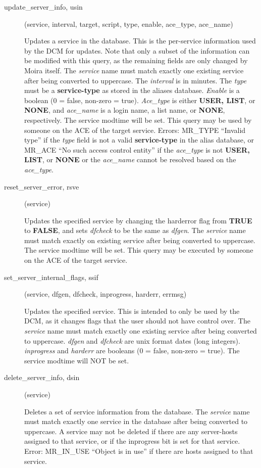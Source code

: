 \documentclass{article}
\begin{document}
\begin{description}
\item[update\_server\_info, usin](service, interval, target, script, type,
enable, ace\_type, ace\_name)

Updates a service in the database.  This is the per-service
information used by the DCM for updates.  Note that only a subset of
the information can be modified with this query, as the remaining
fields are only changed by Moira itself.  The {\em service} name must
match exactly one existing service after being converted to uppercase.
The {\em interval} is in minutes.  The {\em type} must be a
{\bf service-type} as stored in the aliases database.  {\em Enable} is a
boolean (0 = false, non-zero = true).  {\em Ace\_type} is either {\bf USER,
LIST}, or {\bf NONE}, and {\em ace\_name} is a login name, a list name, or
{\bf NONE}, respectively.  The service modtime will be set.  This query
may be used by someone on the ACE of the target service.  Errors:
MR\_TYPE ``Invalid type'' if the {\em type} field is not a valid
{\bf service-type} in the alias database, or MR\_ACE ``No such access
control entity'' if the {\em ace\_type} is not {\bf USER, LIST}, or {\bf NONE}
or the {\em ace\_name} cannot be resolved based on the {\em ace\_type}.

\item[reset\_server\_error, rsve](service)

Updates the specified service by changing the harderror flag from
{\bf TRUE} to {\bf FALSE}, and sets {\em dfcheck} to be the same as
{\em dfgen}.  The {\em service} name must match exactly on existing
service after being converted to uppercase.  The service modtime will
be set.  This query may be executed by someone on the ACE of the
target service.

\item[set\_server\_internal\_flags, ssif](service, dfgen, dfcheck,
inprogress, harderr, errmsg)

Updates the specified service.  This is intended to only be used by
the DCM, as it changes flags that the user should not have control
over.  The {\em service} name must match exactly one existing service
after being converted to uppercase.  {\em dfgen} and {\em dfcheck} are
unix format dates (long integers).  {\em inprogress} and {\em harderr} are
booleans (0 = false, non-zero = true).  The service modtime will NOT
be set.

\item[delete\_server\_info, dsin](service)

Deletes a set of service information from the database.  The
{\em service} name must match exactly one service in the database after
being converted to uppercase.  A service may not be deleted if there
are any server-hosts assigned to that service, or if the inprogress
bit is set for that service.  Error: MR\_IN\_USE ``Object is in use'' if
there are hosts assigned to that service.


\end{description}
\end{document}
